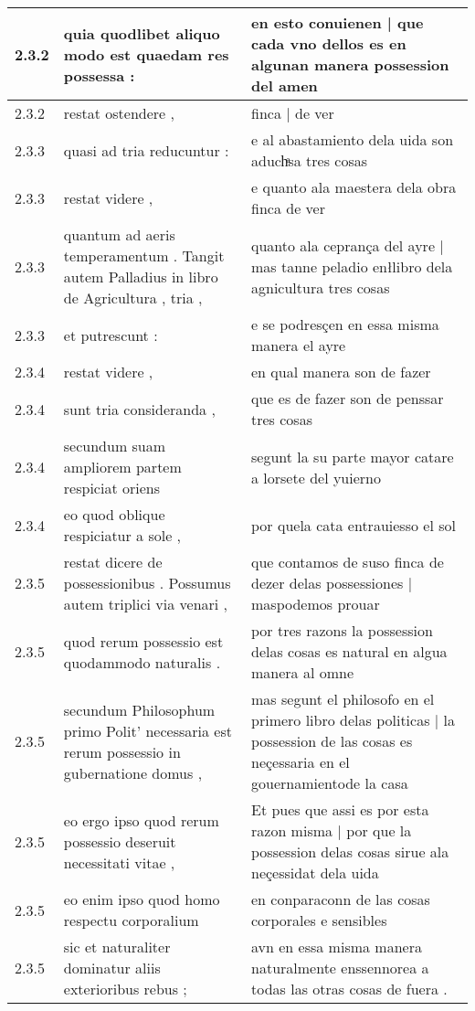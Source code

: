 \begin{tabular}{|p{1cm}|p{6.5cm}|p{6.5cm}|}
2.3.2 & quia quodlibet aliquo modo est quaedam res possessa : & en esto conuienen | que cada vno dellos es en algunan manera possession del amen \\\hline
2.3.2 & restat ostendere , & finca | de ver \\\hline
2.3.3 & quasi ad tria reducuntur : & e al abastamiento dela uida son aduchͣsa tres cosas \\\hline
2.3.3 & restat videre , & e quanto ala maestera dela obra finca de ver \\\hline
2.3.3 & quantum ad aeris temperamentum . Tangit autem Palladius in libro de Agricultura , tria , & quanto ala ceprança del ayre | mas tanne peladio enłlibro dela agnicultura tres cosas \\\hline
2.3.3 & et putrescunt : & e se podresçen en essa misma manera el ayre \\\hline
2.3.4 & restat videre , & en qual manera son de fazer \\\hline
2.3.4 & sunt tria consideranda , & que es de fazer son de penssar tres cosas \\\hline
2.3.4 & secundum suam ampliorem partem respiciat oriens & segunt la su parte mayor catare a lorsete del yuierno \\\hline
2.3.4 & eo quod oblique respiciatur a sole , & por quela cata entrauiesso el sol \\\hline
2.3.5 & restat dicere de possessionibus . Possumus autem triplici via venari , & que contamos de suso finca de dezer delas possessiones | maspodemos prouar \\\hline
2.3.5 & quod rerum possessio est quodammodo naturalis . & por tres razons la possession delas cosas es natural en algua manera al omne \\\hline
2.3.5 & secundum Philosophum primo Polit’ necessaria est rerum possessio in gubernatione domus , & mas segunt el philosofo en el primero libro delas politicas | la possession de las cosas es neçessaria en el gouernamientode la casa \\\hline
2.3.5 & eo ergo ipso quod rerum possessio deseruit necessitati vitae , & Et pues que assi es por esta razon misma | por que la possession delas cosas sirue ala neçessidat dela uida \\\hline
2.3.5 & eo enim ipso quod homo respectu corporalium & en conparaconn de las cosas corporales e sensibles \\\hline
2.3.5 & sic et naturaliter dominatur aliis exterioribus rebus ; & avn en essa misma manera naturalmente enssennorea a todas las otras cosas de fuera . \\\hline

\end{tabular}
